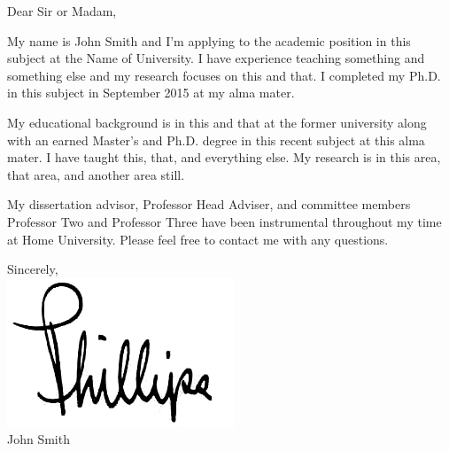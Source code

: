 \documentclass[letterpaper,11pt,oneside]{article}
\begin{document}
\vspace{2em}

Dear Sir or Madam, \\

\vspace{1em}
\onehalfspacing

My name is John Smith and I'm applying to the academic position in this subject at the Name of University. I have experience teaching something and something else and my research focuses on this and that. I completed my Ph.D. in this subject in September 2015 at my alma mater.

\vspace{1em}

My educational background is in this and that at the former university along with an earned Master's and Ph.D. degree in this recent subject at this alma mater. I have taught this, that, and everything else. My research is in this area, that area, and another area still.

\vspace{1em}

My dissertation advisor, Professor Head Adviser, and committee members Professor Two and Professor Three have been instrumental throughout my time at Home University. Please feel free to contact me with any questions.

\vspace{1em}

\begin{flushright}
Sincerely, \\
\vspace{1em} 
\includegraphics[scale=0.4]{Phillips} \\ %
\vspace{1em} 
John Smith \\
\end{flushright}
\end{document}
